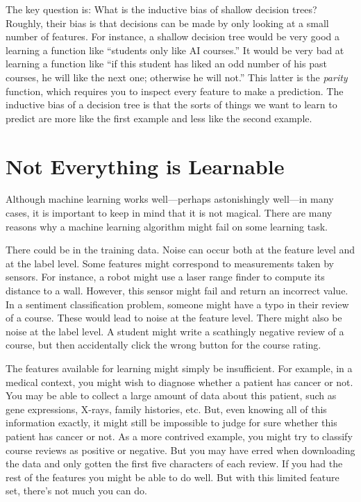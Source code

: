 The key question is: What is the inductive bias of shallow decision
trees?  Roughly, their bias is that decisions can be made by only
looking at a small number of features.  For instance, a shallow
decision tree would be very good a learning a function like ``students
only like AI courses.''  It would be very bad at learning a function
like ``if this student has liked an odd number of his past courses, he
will like the next one; otherwise he will not.''  This latter is the
\emph{parity} function, which requires you to inspect every feature to
make a prediction.  The inductive bias of a decision tree is that the
sorts of things we want to learn to predict are more like the first
example and less like the second example.


\section{Not Everything is Learnable}

Although machine learning works well---perhaps astonishingly well---in
many cases, it is important to keep in mind that it is not magical.
There are many reasons why a machine learning algorithm might fail on
some learning task.

There could be  in the training data.  Noise can occur
both at the feature level and at the label level.  Some features might
correspond to measurements taken by sensors.  For instance, a robot
might use a laser range finder to compute its distance to a wall.
However, this sensor might fail and return an incorrect value.  In a
sentiment classification problem, someone might have a typo in their
review of a course.  These would lead to noise at the feature level.
There might also be noise at the label level.  A student might write a
scathingly negative review of a course, but then accidentally click
the wrong button for the course rating.

The features available for learning might simply be insufficient.  For
example, in a medical context, you might wish to diagnose whether a
patient has cancer or not.  You may be able to collect a large amount
of data about this patient, such as gene expressions, X-rays, family
histories, etc.  But, even knowing all of this information exactly, it
might still be impossible to judge for sure whether this patient has
cancer or not.  As a more contrived example, you might try to classify
course reviews as positive or negative.  But you may have erred when
downloading the data and only gotten the first five characters of each
review.  If you had the rest of the features you might be able to do
well.  But with this limited feature set, there's not much you can do.

